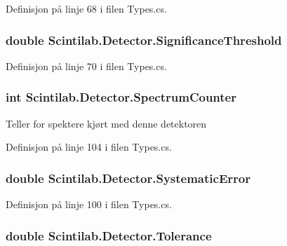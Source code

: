 Definisjon på linje 68 i filen Types.\+cs.

\hypertarget{class_scintilab_1_1_detector_a47d61c404bffea0634c018b1eb394689}{
\subsubsection[{Significance\+Threshold}]{\setlength{\rightskip}{0pt plus 5cm}double Scintilab.\+Detector.\+Significance\+Threshold}}\label{class_scintilab_1_1_detector_a47d61c404bffea0634c018b1eb394689}


Definisjon på linje 70 i filen Types.\+cs.

\hypertarget{class_scintilab_1_1_detector_a94d125f00803b002bc7b6be2c3fe2bd1}{
\subsubsection[{Spectrum\+Counter}]{\setlength{\rightskip}{0pt plus 5cm}int Scintilab.\+Detector.\+Spectrum\+Counter}}\label{class_scintilab_1_1_detector_a94d125f00803b002bc7b6be2c3fe2bd1}
Teller for spektere kjørt med denne detektoren 

Definisjon på linje 104 i filen Types.\+cs.

\hypertarget{class_scintilab_1_1_detector_aff4481284f02b788607bbcf9d55f3880}{
\subsubsection[{Systematic\+Error}]{\setlength{\rightskip}{0pt plus 5cm}double Scintilab.\+Detector.\+Systematic\+Error}}\label{class_scintilab_1_1_detector_aff4481284f02b788607bbcf9d55f3880}


Definisjon på linje 100 i filen Types.\+cs.

\hypertarget{class_scintilab_1_1_detector_a4641161eb001c1de9b81e5681f489acf}{
\subsubsection[{Tolerance}]{\setlength{\rightskip}{0pt plus 5cm}double Scintilab.\+Detector.\+Tolerance}}\label{class_scintilab_1_1_detector_a4641161eb001c1de9b81e5681f489acf}


